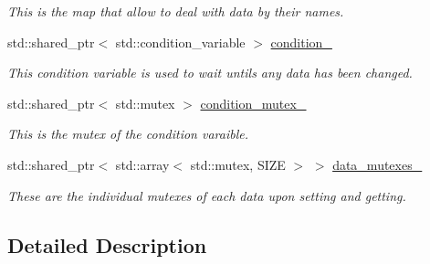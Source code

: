 \begin{DoxyCompactItemize}
\begin{DoxyCompactList}\small\item\em This is the map that allow to deal with data by their names. \end{DoxyCompactList}\item 
std\+::shared\+\_\+ptr$<$ std\+::condition\+\_\+variable $>$ \hyperlink{classreal__time__tools_1_1SingletypeThreadsafeObject_a628a0eb20c8a683a95607468653c7b2e}{condition\+\_\+}\hypertarget{classreal__time__tools_1_1SingletypeThreadsafeObject_a628a0eb20c8a683a95607468653c7b2e}{}\label{classreal__time__tools_1_1SingletypeThreadsafeObject_a628a0eb20c8a683a95607468653c7b2e}

\begin{DoxyCompactList}\small\item\em This condition variable is used to wait untils any data has been changed. \end{DoxyCompactList}\item 
std\+::shared\+\_\+ptr$<$ std\+::mutex $>$ \hyperlink{classreal__time__tools_1_1SingletypeThreadsafeObject_aa0bbdbc03580868de0a04e5be234408d}{condition\+\_\+mutex\+\_\+}\hypertarget{classreal__time__tools_1_1SingletypeThreadsafeObject_aa0bbdbc03580868de0a04e5be234408d}{}\label{classreal__time__tools_1_1SingletypeThreadsafeObject_aa0bbdbc03580868de0a04e5be234408d}

\begin{DoxyCompactList}\small\item\em This is the mutex of the condition varaible. \end{DoxyCompactList}\item 
std\+::shared\+\_\+ptr$<$ std\+::array$<$ std\+::mutex, S\+I\+ZE $>$ $>$ \hyperlink{classreal__time__tools_1_1SingletypeThreadsafeObject_a55f7e015fa4915ea1c3af34757c2f671}{data\+\_\+mutexes\+\_\+}\hypertarget{classreal__time__tools_1_1SingletypeThreadsafeObject_a55f7e015fa4915ea1c3af34757c2f671}{}\label{classreal__time__tools_1_1SingletypeThreadsafeObject_a55f7e015fa4915ea1c3af34757c2f671}

\begin{DoxyCompactList}\small\item\em These are the individual mutexes of each data upon setting and getting. \end{DoxyCompactList}\end{DoxyCompactItemize}


\subsection{Detailed Description}
